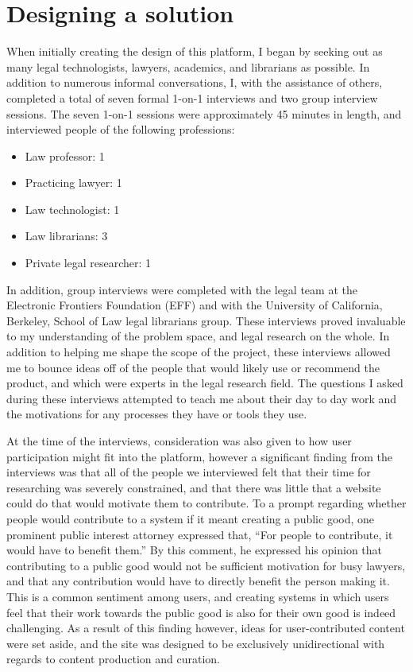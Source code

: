 \label{solutiondesign}
\section{Designing a solution}
When initially creating the design of this platform, I began by seeking out as many legal technologists, lawyers, academics, and librarians as possible. In addition to numerous informal conversations, I, with the assistance of others, completed a total of seven formal 1-on-1 interviews and two group interview sessions. The seven 1-on-1 sessions were approximately 45 minutes in length, and interviewed people of the following professions:
\begin{itemize}
\item Law professor: 1 
\item Practicing lawyer: 1
\item Law technologist: 1
\item Law librarians: 3
\item Private legal researcher: 1
\end{itemize}
In addition, group interviews were completed with the legal team at the Electronic Frontiers Foundation (EFF) and with the University of California, Berkeley, School of Law legal librarians group. These interviews proved invaluable to my understanding of the problem space, and legal research on the whole. In addition to helping me shape the scope of the project, these interviews allowed me to bounce ideas off of the people that would likely use or recommend the product, and which were experts in the legal research field. The questions I asked during these interviews attempted to teach me about their day to day work and the motivations for any processes they have or tools they use. 

At the time of the interviews, consideration was also given to how user participation might fit into the platform, however a significant finding from the interviews was that all of the people we interviewed felt that their time for researching was severely constrained, and that there was little that a website could do that would motivate them to contribute. To a prompt regarding whether people would contribute to a system if it meant creating a public good, one prominent public interest attorney expressed that, ``For people to contribute, it would have to benefit them.'' By this comment, he expressed his opinion that contributing to a public good would not be sufficient motivation for busy lawyers, and that any contribution would have to directly benefit the person making it. This is a common sentiment among users, and creating systems in which users feel that their work towards the public good is also for their own good is indeed challenging. As a result of this finding however, ideas for user-contributed content were set aside, and the site was designed to be exclusively unidirectional with regards to content production and curation.

